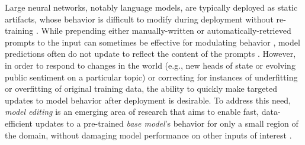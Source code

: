 



Large neural networks, notably language models, are typically deployed as static artifacts, whose behavior is difficult to modify during deployment without re-training \citep{lazaridou2021mind}. While prepending either manually-written or automatically-retrieved prompts to the input can sometimes be effective for modulating behavior \citep{brown2020language}, model predictions often do not update to reflect the content of the prompts \citep{lewis2020retrieval}. However, in order to respond to changes in the world 
(e.g., new heads of state or evolving public sentiment on a particular topic) or correcting for instances of underfitting or overfitting of original training data,
the ability to quickly make targeted updates to model behavior after deployment is desirable. To address this need, \textit{model editing} is an emerging area of research that aims to enable fast, data-efficient updates to a pre-trained \textit{base model}'s behavior for only a small region of the domain, without damaging model performance on other inputs of interest \citep{Sinitsin2020Editable,zhu2020modifying,sotoudeh2019correcting,Cao2021EditingFK,dai2021knowledge,mitchell2021fast,hase2021language,anon2021moving}.

